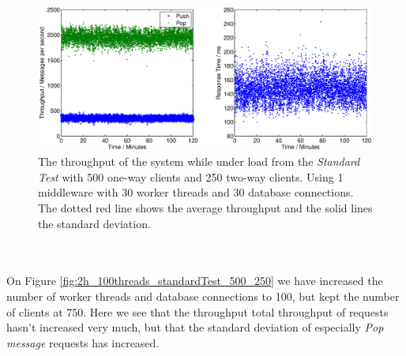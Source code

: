 \documentclass{article}
\begin{document}
            \begin{figure}[H]
                \hspace{-1.5cm}
                \includegraphics[scale=0.750]{2h_30threads_standardTest_500_250}
                \caption{The throughput of the system while under load from the \textit{Standard Test} with 500 one-way clients and 250 two-way clients. Using 1 middleware with 30 worker threads and 30 database connections. The dotted red line shows the average throughput and the solid lines the standard deviation.}
                \label{fig:2h_30threads_standardTest_500_250}
            \end{figure}
            ~\\
            \\
            On Figure \ref{fig:2h_100threads_standardTest_500_250} we have increased the number of worker threads and database connections to 100, but kept the number of clients at 750. Here we see that the throughput total throughput of requests hasn't increased very much, but that the standard deviation of especially \textit{Pop message} requests has increased.
                
\end{document}
